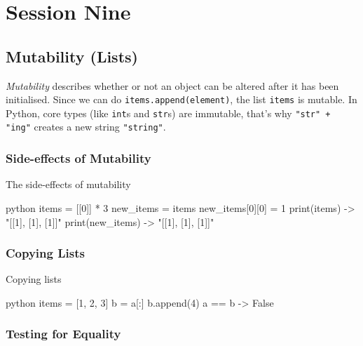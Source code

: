 \section{Session Nine}\label{sec:session_nine}

\subsection{Mutability (Lists)}\label{sub:mutability}

\emph{Mutability} describes whether or not an object can be altered after it has been initialised.
Since we can do \texttt{items.append(element)}, the list \texttt{items} is mutable.
In Python, core types (like \texttt{int}s and \texttt{str}s) are immutable, that's why \texttt{"str" + "ing"} creates a new string \texttt{"string"}.

\subsubsection{Side-effects of Mutability}\label{ssub:side_effects_of_mutability}

\begin{highlight}{The side-effects of mutability}
    \begin{code}{python}
        items = [[0]] * 3
        new_items = items
        new_items[0][0] = 1
        print(items) -> "[[1], [1], [1]]"
        print(new_items) -> "[[1], [1], [1]]"
    \end{code}
\end{highlight}

\subsubsection{Copying Lists}\label{ssub:copying_lists}

\begin{highlight}{Copying lists}
    \begin{code}{python}
        items = [1, 2, 3]
        b = a[:]
        b.append(4)
        a == b -> False
    \end{code}
\end{highlight}

\subsubsection{Testing for Equality}\label{ssub:testing_for_equality}

